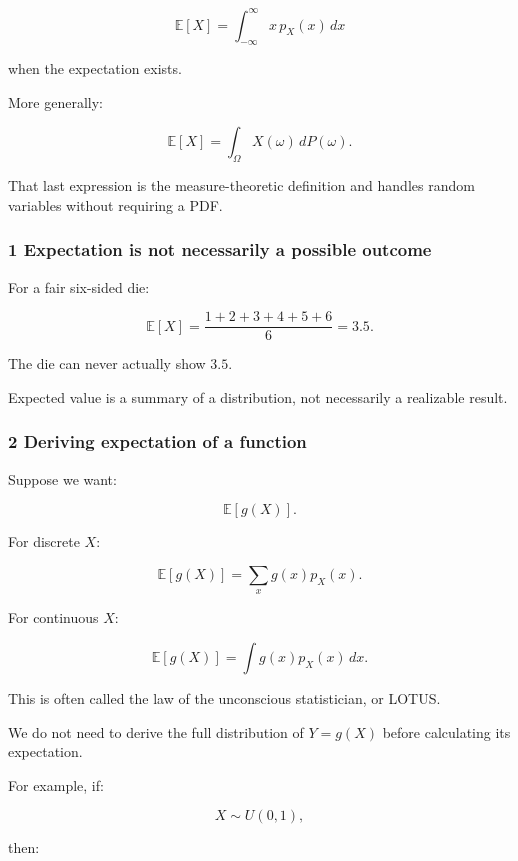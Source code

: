 \[
 \boxed{ \mathbb E[X]= \int_{-\infty}^{\infty}x\,p_X(x)\,dx }
\]

when the expectation exists.

More generally:

\[
 \mathbb E[X]=\int_\Omega X(\omega)\,dP(\omega).
\]

That last expression is the measure-theoretic definition and handles random variables without requiring a PDF.

\subsubsection{1 Expectation is not necessarily a possible outcome}\label{02-foundations-ii-ch023-expectation-is-not-necessarily-a-possible-outcome}

\hypertarget{02-foundations-ii-ch023-expectation-is-not-necessarily-a-possible-outcome}{}

For a fair six-sided die:

\[
 \mathbb E[X] = \frac{1+2+3+4+5+6}{6} =\boxed{3.5}.
\]

The die can never actually show \(3.5\).

Expected value is a summary of a distribution, not necessarily a realizable result.

\subsubsection{2 Deriving expectation of a function}\label{02-foundations-ii-ch023-deriving-expectation-of-a-function}

\hypertarget{02-foundations-ii-ch023-deriving-expectation-of-a-function}{}

Suppose we want:

\[
 \mathbb E[g(X)].
\]

For discrete \(X\):

\[
 \boxed{ \mathbb E[g(X)] = \sum_xg(x)p_X(x) }.
\]

For continuous \(X\):

\[
 \boxed{ \mathbb E[g(X)] = \int g(x)p_X(x)\,dx }.
\]

This is often called the law of the unconscious statistician, or LOTUS.

We do not need to derive the full distribution of \(Y=g(X)\) before calculating its expectation.

For example, if:

\[
 X\sim U(0,1),
\]

then:

